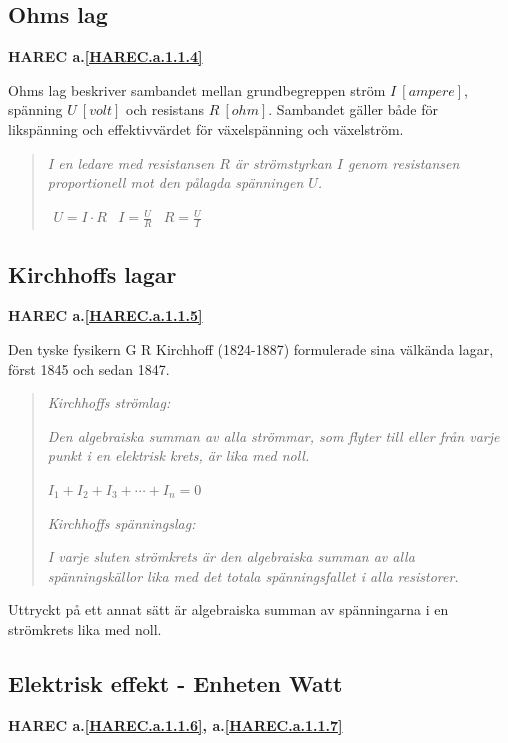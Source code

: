 \subsection{Ohms lag}
\textbf{HAREC a.\ref{HAREC.a.1.1.4}\label{myHAREC.a.1.1.4}}

Ohms lag beskriver sambandet mellan grundbegreppen ström \(I\ [ampere]\),
spänning \(U\ [volt]\) och resistans \(R\ [ohm]\).
Sambandet gäller både för likspänning och effektivvärdet för växelspänning och
växelström.

\begin{quote}
\emph{I en ledare med resistansen \(R\) är strömstyrkan \(I\) genom resistansen
proportionell mot den pålagda spänningen \(U\).}

\(\begin{array}{ccc}U=I \cdot R & I=\frac{U}{R} & R=\frac{U}{I}\end{array}\)
\end{quote}

\subsection{Kirchhoffs lagar}
\textbf{HAREC a.\ref{HAREC.a.1.1.5}\label{myHAREC.a.1.1.5}}

Den tyske fysikern G R Kirchhoff (1824-1887) formulerade sina välkända lagar,
först 1845 och sedan 1847.

\begin{quote}
\emph{Kirchhoffs strömlag:}

\emph{Den algebraiska summan av alla strömmar, som flyter till eller från varje punkt
i en elektrisk krets, är lika med noll.}

\(I_1 + I_2 + I_3 + \cdots + I_n = 0\)

\emph{Kirchhoffs spänningslag:}

\emph{I varje sluten strömkrets är den algebraiska summan av alla spänningskällor lika
med det totala spänningsfallet i alla resistorer.}
\end{quote}

Uttryckt på ett annat sätt är algebraiska summan av spänningarna i en
strömkrets lika med noll.

\subsection{Elektrisk effekt - Enheten Watt}
\textbf{HAREC a.\ref{HAREC.a.1.1.6}\label{myHAREC.a.1.1.6}, a.\ref{HAREC.a.1.1.7}\label{myHAREC.a.1.1.7}}

